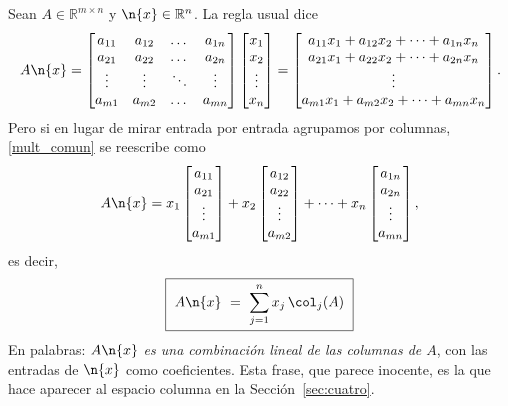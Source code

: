 Sean $A\in \mathbb{R}^{m\times n}$ y $\n{x}\in\mathbb{R}^n$. La regla usual dice
\begin{equation}
A\n{x} =
\begin{bmatrix}
a_{11} & a_{12} & \dots & a_{1n} \\
a_{21} & a_{22} & \dots & a_{2n} \\
\vdots & \vdots & \ddots & \vdots \\
a_{m1} & a_{m2} & \dots & a_{mn}
\end{bmatrix}
\begin{bmatrix} x_1 \\ x_2 \\ \vdots \\ x_n \end{bmatrix}
=
\begin{bmatrix}
a_{11}x_1 + a_{12}x_2 + \dots + a_{1n}x_n \\
a_{21}x_1 + a_{22}x_2 + \dots + a_{2n}x_n \\
\vdots \\
a_{m1}x_1 + a_{m2}x_2 + \dots + a_{mn}x_n
\end{bmatrix}.
\label{mult_comun}
\end{equation}
Pero si en lugar de mirar entrada por entrada agrupamos por columnas,
\eqref{mult_comun} se reescribe como
\[
A\n{x} =
x_1 \begin{bmatrix} a_{11} \\ a_{21} \\ \vdots \\ a_{m1} \end{bmatrix}
+ x_2 \begin{bmatrix} a_{12} \\ a_{22} \\ \vdots \\ a_{m2} \end{bmatrix}
+ \dots + x_n \begin{bmatrix} a_{1n} \\ a_{2n} \\ \vdots \\ a_{mn} \end{bmatrix},
\]
es decir,
\begin{equation}
\boxed{\ A\n{x} \ =\ \sum_{j=1}^n x_j \, \col_j(A) \ }
\label{eq:mat-vec-col}
\end{equation}
En palabras: \emph{$A\n{x}$ es una combinación lineal de las columnas de $A$},
con las entradas de $\n{x}$ como coeficientes. Esta frase, que parece inocente, es la
que hace aparecer al espacio columna en la Sección~\ref{sec:cuatro}.

